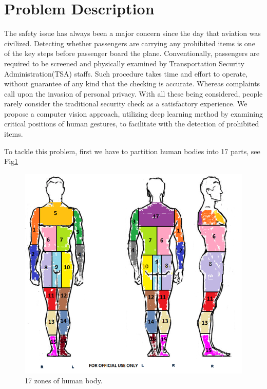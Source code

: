 \documentclass[conference,compsoc]{IEEEtran}
\begin{document}
\section{Problem Description}
	\par The safety issue has always been a major concern since the day that aviation was civilized. 
	Detecting whether passengers are carrying any prohibited items is one of the key steps before passenger board the plane. 
	Conventionally, passengers are required to be screened and physically examined by Transportation Security Administration(TSA) staffs. 
	Such procedure takes time and effort to operate, without guarantee of any kind that the checking is accurate. 
	Whereas complaints call upon the invasion of personal privacy. 
	With all these being considered, people rarely consider the traditional security check as a satisfactory experience. 
	We propose a computer vision approach, utilizing deep learning method by examining critical positions of human gestures, to facilitate with the detection of prohibited items.
	\par To tackle this problem, first we have to partition human bodies into 17 parts, see Fig\ref{bodyzones}
	\begin{figure} [ht]
		\centering
		\includegraphics[width=\linewidth]{./Pic/body_zones}
		\caption{17 zones of human body.}
		\label{bodyzones}
	\end{figure}
\end{document}
